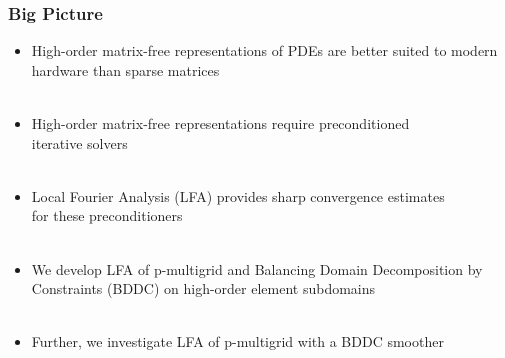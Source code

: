 \documentclass{beamer}
\begin{document}
\begin{frame}
\begin{center}
\frametitle{Big Picture}

\begin{itemize}

\item High-order matrix-free representations of PDEs are better suited to modern hardware than sparse matrices\\

~\\

\item High-order matrix-free representations require preconditioned\\iterative solvers\\

~\\

\item Local Fourier Analysis (LFA) provides sharp convergence estimates\\for these preconditioners\\

~\\

\item We develop LFA of p-multigrid and Balancing Domain Decomposition by Constraints (BDDC) on high-order element subdomains\\

~\\

\item Further, we investigate LFA of p-multigrid with a BDDC smoother

\end{itemize}

\end{center}
\end{frame}

\end{document}
